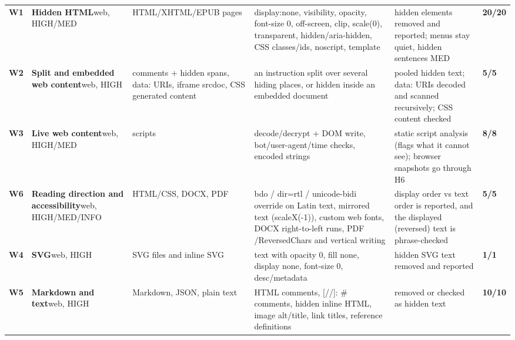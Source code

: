 \documentclass[10pt,a4paper]{article}
\begin{document}
\begin{longtable}{@{}P{0.6cm}P{2.6cm}P{3.1cm}P{4.4cm}P{4.4cm}P{1.4cm}@{}}
\textbf{W1} & \textbf{Hidden HTML}\newline\footnotesize web, HIGH/MED & \footnotesize HTML/XHTML/EPUB pages & \footnotesize display:none, visibility, opacity, font-size 0, off-screen, clip, scale(0), transparent, hidden/aria-hidden, CSS classes/ids, noscript, template & \footnotesize hidden elements removed and reported; menus stay quiet, hidden sentences MED & \textcolor{ok}{\textbf{20/20}}\\
\textbf{W2} & \textbf{Split and embedded web content}\newline\footnotesize web, HIGH & \footnotesize comments + hidden spans, data: URIs, iframe srcdoc, CSS generated content & \footnotesize an instruction split over several hiding places, or hidden inside an embedded document & \footnotesize pooled hidden text; data: URIs decoded and scanned recursively; CSS content checked & \textcolor{ok}{\textbf{5/5}}\\
\textbf{W3} & \textbf{Live web content}\newline\footnotesize web, HIGH/MED & \footnotesize scripts & \footnotesize decode/decrypt + DOM write, bot/user-agent/time checks, encoded strings & \footnotesize static script analysis (flags what it cannot see); browser snapshots go through H6 & \textcolor{ok}{\textbf{8/8}}\\
\textbf{W6} & \textbf{Reading direction and accessibility}\newline\footnotesize web, HIGH/MED/INFO & \footnotesize HTML/CSS, DOCX, PDF & \footnotesize bdo / dir=rtl / unicode-bidi override on Latin text, mirrored text (scaleX(-1)), custom web fonts, DOCX right-to-left runs, PDF /ReversedChars and vertical writing & \footnotesize display order vs text order is reported, and the displayed (reversed) text is phrase-checked & \textcolor{ok}{\textbf{5/5}}\\
\textbf{W4} & \textbf{SVG}\newline\footnotesize web, HIGH & \footnotesize SVG files and inline SVG & \footnotesize text with opacity 0, fill none, display none, font-size 0, desc/metadata & \footnotesize hidden SVG text removed and reported & \textcolor{ok}{\textbf{1/1}}\\
\textbf{W5} & \textbf{Markdown and text}\newline\footnotesize web, HIGH & \footnotesize Markdown, JSON, plain text & \footnotesize HTML comments, [//]: \# comments, hidden inline HTML, image alt/title, link titles, reference definitions & \footnotesize removed or checked as hidden text & \textcolor{ok}{\textbf{10/10}}\\

\end{longtable}
\end{document}
